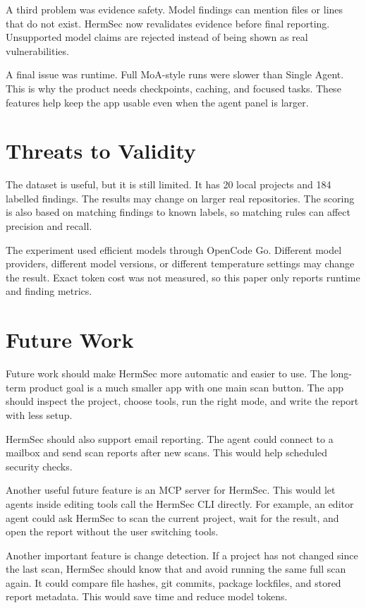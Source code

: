 \documentclass[sigconf,nonacm]{acmart}
\begin{document}
A third problem was evidence safety. Model findings can mention files or lines that do not exist. HermSec now revalidates evidence before final reporting. Unsupported model claims are rejected instead of being shown as real vulnerabilities.

A final issue was runtime. Full MoA-style runs were slower than Single Agent. This is why the product needs checkpoints, caching, and focused tasks. These features help keep the app usable even when the agent panel is larger.

\section{Threats to Validity}
The dataset is useful, but it is still limited. It has 20 local projects and 184 labelled findings. The results may change on larger real repositories. The scoring is also based on matching findings to known labels, so matching rules can affect precision and recall.

The experiment used efficient models through OpenCode Go. Different model providers, different model versions, or different temperature settings may change the result. Exact token cost was not measured, so this paper only reports runtime and finding metrics.

\section{Future Work}
Future work should make HermSec more automatic and easier to use. The long-term product goal is a much smaller app with one main scan button. The app should inspect the project, choose tools, run the right mode, and write the report with less setup.

HermSec should also support email reporting. The agent could connect to a mailbox and send scan reports after new scans. This would help scheduled security checks.

Another useful future feature is an MCP server for HermSec. This would let agents inside editing tools call the HermSec CLI directly. For example, an editor agent could ask HermSec to scan the current project, wait for the result, and open the report without the user switching tools.

Another important feature is change detection. If a project has not changed since the last scan, HermSec should know that and avoid running the same full scan again. It could compare file hashes, git commits, package lockfiles, and stored report metadata. This would save time and reduce model tokens.
\end{document}

